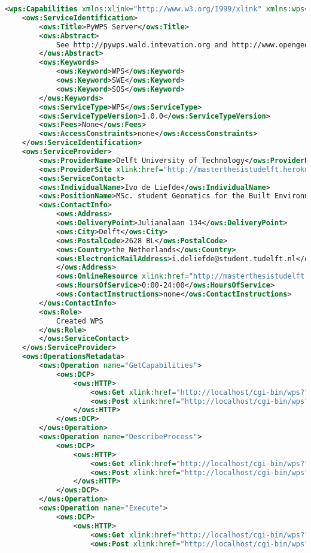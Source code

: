 \begin{lstlisting}[language=xml]
<wps:Capabilities xmlns:xlink="http://www.w3.org/1999/xlink" xmlns:wps="http://www.opengis.net/wps/1.0.0" xmlns:ows="http://www.opengis.net/ows/1.1" xmlns:xsi="http://www.w3.org/2001/XMLSchema-instance" service="WPS" version="1.0.0" xml:lang="en-CA" xsi:schemaLocation="http://www.opengis.net/wps/1.0.0 http://schemas.opengis.net/wps/1.0.0/wpsGetCapabilities_response.xsd" updateSequence="1">
	<ows:ServiceIdentification>
		<ows:Title>PyWPS Server</ows:Title>
		<ows:Abstract>
			See http://pywps.wald.intevation.org and http://www.opengeospatial.org/standards/wps
		</ows:Abstract>
		<ows:Keywords>
			<ows:Keyword>WPS</ows:Keyword>
			<ows:Keyword>SWE</ows:Keyword>
			<ows:Keyword>SOS</ows:Keyword>
		</ows:Keywords>
		<ows:ServiceType>WPS</ows:ServiceType>
		<ows:ServiceTypeVersion>1.0.0</ows:ServiceTypeVersion>
		<ows:Fees>None</ows:Fees>
		<ows:AccessConstraints>none</ows:AccessConstraints>
	</ows:ServiceIdentification>
	<ows:ServiceProvider>
		<ows:ProviderName>Delft University of Technology</ows:ProviderName>
		<ows:ProviderSite xlink:href="http://masterthesistudelft.herokuapp.com/"/>
		<ows:ServiceContact>
		<ows:IndividualName>Ivo de Liefde</ows:IndividualName>
		<ows:PositionName>MSc. student Geomatics for the Built Environment</ows:PositionName>
		<ows:ContactInfo>
			<ows:Address>
			<ows:DeliveryPoint>Julianalaan 134</ows:DeliveryPoint>
			<ows:City>Delft</ows:City>
			<ows:PostalCode>2628 BL</ows:PostalCode>
			<ows:Country>the Netherlands</ows:Country>
			<ows:ElectronicMailAddress>i.deliefde@student.tudelft.nl</ows:ElectronicMailAddress>
			</ows:Address>
			<ows:OnlineResource xlink:href="http://masterthesistudelft.herokuapp.com/"/>
			<ows:HoursOfService>0:00-24:00</ows:HoursOfService>
			<ows:ContactInstructions>none</ows:ContactInstructions>
		</ows:ContactInfo>
		<ows:Role>
			Created WPS
		</ows:Role>
		</ows:ServiceContact>
	</ows:ServiceProvider>
	<ows:OperationsMetadata>
		<ows:Operation name="GetCapabilities">
			<ows:DCP>
				<ows:HTTP>
					<ows:Get xlink:href="http://localhost/cgi-bin/wps?"/>
					<ows:Post xlink:href="http://localhost/cgi-bin/wps"/>
				</ows:HTTP>
			</ows:DCP>
		</ows:Operation>
		<ows:Operation name="DescribeProcess">
			<ows:DCP>
				<ows:HTTP>
					<ows:Get xlink:href="http://localhost/cgi-bin/wps?"/>
					<ows:Post xlink:href="http://localhost/cgi-bin/wps"/>
				</ows:HTTP>
			</ows:DCP>
		</ows:Operation>
		<ows:Operation name="Execute">
			<ows:DCP>
				<ows:HTTP>
					<ows:Get xlink:href="http://localhost/cgi-bin/wps?"/>
					<ows:Post xlink:href="http://localhost/cgi-bin/wps"/>

\end{lstlisting}

